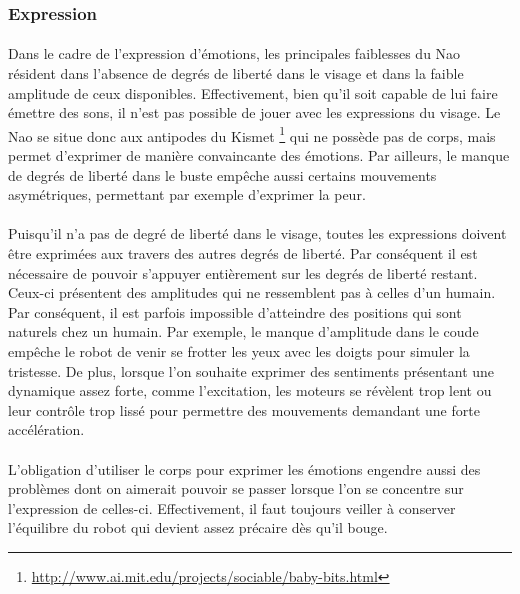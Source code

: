 \subsubsection{Expression}
\paragraph{}
Dans le cadre de l'expression d'émotions, les principales faiblesses du Nao
résident dans l'absence de degrés de liberté dans le visage et
dans la faible amplitude de ceux disponibles. Effectivement, bien qu'il soit
capable de lui faire émettre des sons, il n'est pas possible de jouer avec 
les expressions du visage. Le Nao se situe donc aux antipodes du Kismet
\footnote{\url{http://www.ai.mit.edu/projects/sociable/baby-bits.html}} qui
ne possède pas de corps, mais permet d'exprimer de manière convaincante des
émotions. Par ailleurs, le manque de degrés de liberté dans le buste empêche
aussi certains mouvements asymétriques, permettant par exemple d'exprimer la
peur.

\paragraph{}
Puisqu'il n'a pas de degré de liberté dans le visage, toutes les expressions
doivent être exprimées aux travers des autres degrés de liberté. Par
conséquent il est nécessaire de pouvoir s'appuyer entièrement sur les degrés
de liberté restant. Ceux-ci présentent des amplitudes qui ne ressemblent pas
à celles d'un humain. Par conséquent, il est parfois impossible d'atteindre
des positions qui sont naturels chez un humain. Par exemple, le manque
d'amplitude dans le coude empêche le robot de venir se frotter les yeux avec
les doigts pour simuler la tristesse. De plus, lorsque l'on souhaite
exprimer des sentiments présentant une dynamique assez forte, comme
l'excitation, les moteurs se révèlent trop lent ou leur contrôle trop lissé
pour permettre des mouvements demandant une forte accélération.

\paragraph{}
L'obligation d'utiliser le corps pour exprimer les émotions engendre aussi
des problèmes dont on aimerait pouvoir se passer lorsque l'on se concentre
sur l'expression de celles-ci. Effectivement, il faut toujours veiller à
conserver l'équilibre du robot qui devient assez précaire dès qu'il bouge.

